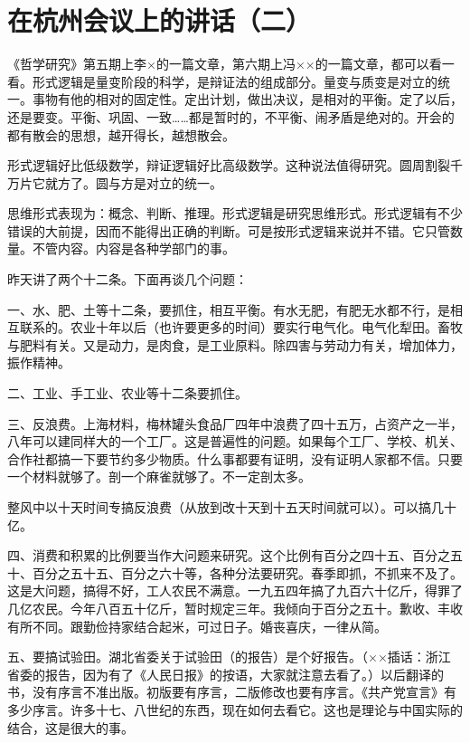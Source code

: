\section[在杭州会议上的讲话（二）（一九五八年一月四日）]{在杭州会议上的讲话（二）}


《哲学研究》第五期上李×的一篇文章，第六期上冯××的一篇文章，都可以看一看。形式逻辑是量变阶段的科学，是辩证法的组成部分。量变与质变是对立的统一。事物有他的相对的固定性。定出计划，做出决议，是相对的平衡。定了以后，还是要变。平衡、巩固、一致……都是暂时的，不平衡、闹矛盾是绝对的。开会的都有散会的思想，越开得长，越想散会。

形式逻辑好比低级数学，辩证逻辑好比高级数学。这种说法值得研究。圆周割裂千万片它就方了。圆与方是对立的统一。

思维形式表现为：概念、判断、推理。形式逻辑是研究思维形式。形式逻辑有不少错误的大前提，因而不能得出正确的判断。可是按形式逻辑来说并不错。它只管数量。不管内容。内容是各种学部门的事。

昨天讲了两个十二条。下面再谈几个问题：

一、水、肥、土等十二条，要抓住，相互平衡。有水无肥，有肥无水都不行，是相互联系的。农业十年以后（也许要更多的时间）要实行电气化。电气化犁田。畜牧与肥料有关。又是动力，是肉食，是工业原料。除四害与劳动力有关，增加体力，振作精神。

二、工业、手工业、农业等十二条要抓住。

三、反浪费。上海材料，梅林罐头食品厂四年中浪费了四十五万，占资产之一半，八年可以建同样大的一个工厂。这是普遍性的问题。如果每个工厂、学校、机关、合作社都搞一下要节约多少物质。什么事都要有证明，没有证明人家都不信。只要一个材料就够了。剖一个麻雀就够了。不一定剖太多。

整风中以十天时间专搞反浪费（从放到改十天到十五天时间就可以）。可以搞几十亿。

四、消费和积累的比例要当作大问题来研究。这个比例有百分之四十五、百分之五十、百分之五十五、百分之六十等，各种分法要研究。春季即抓，不抓来不及了。这是大问题，搞得不好，工人农民不满意。一九五四年搞了九百六十亿斤，得罪了几亿农民。今年八百五十亿斤，暂时规定三年。我倾向于百分之五十。歉收、丰收有所不同。跟勤俭持家结合起米，可过日子。婚丧喜庆，一律从简。

五、要搞试验田。湖北省委关于试验田（的报告）是个好报告。（××插话：浙江省委的报告，因为有了《人民日报》的按语，大家就注意去看了。）以后翻译的书，没有序言不准出版。初版要有序言，二版修改也要有序言。《共产党宣言》有多少序言。许多十七、八世纪的东西，现在如何去看它。这也是理论与中国实际的结合，这是很大的事。

